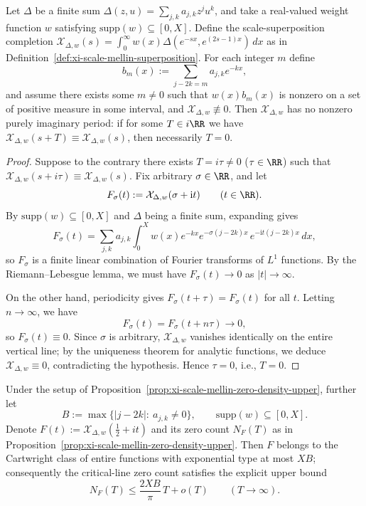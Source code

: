 \begin{proposition}\label{prop:xi-scale-mellin-no-nonzero-imag-period}
Let \(\Delta\) be a finite sum
\(
\Delta(z,u)=\sum_{j,k}a_{j,k}z^j u^k
\), and take a real-valued weight function \(w\) satisfying \(\mathrm{supp}(w)\subseteq[0,X]\).
Define the scale-superposition completion
\(
\mathcal X_{\Delta,w}(s)=\int_0^\infty w(x)\Delta(e^{-sx},e^{(2s-1)x})\,dx
\)
as in Definition~\ref{def:xi-scale-mellin-superposition}.
For each integer \(m\) define
\[
b_m(x):=\sum_{j-2k=m}a_{j,k}e^{-kx},
\]
and assume there exists some \(m\neq 0\) such that \(w(x)b_m(x)\) is nonzero on a set of positive measure in some interval, and \(\mathcal X_{\Delta,w}\not\equiv 0\).
Then \(\mathcal X_{\Delta,w}\) has no nonzero purely imaginary period: if for some \(T\in i\RR\) we have
\(
\mathcal X_{\Delta,w}(s+T)\equiv \mathcal X_{\Delta,w}(s)
\), then necessarily \(T=0\).
\end{proposition}

\begin{proof}
Suppose to the contrary there exists \(T=i\tau\neq 0\) (\(\tau\in\RR\)) such that \(\mathcal X_{\Delta,w}(s+i\tau)\equiv \mathcal X_{\Delta,w}(s)\).
Fix arbitrary \(\sigma\in\RR\), and let
\[
F_\sigma(t):=\mathcal X_{\Delta,w}(\sigma+\mathrm{i}t)\qquad(t\in\RR).
\]
By \(\mathrm{supp}(w)\subseteq[0,X]\) and \(\Delta\) being a finite sum, expanding gives
\[
F_\sigma(t)
=\sum_{j,k}a_{j,k}\int_0^X w(x)e^{-kx}e^{-\sigma(j-2k)x}\,e^{-\mathrm{i}t(j-2k)x}\,dx,
\]
so \(F_\sigma\) is a finite linear combination of Fourier transforms of \(L^1\) functions.
By the Riemann--Lebesgue lemma, we must have \(F_\sigma(t)\to 0\) as \(|t|\to\infty\).
\par
On the other hand, periodicity gives \(F_\sigma(t+\tau)=F_\sigma(t)\) for all \(t\).
Letting \(n\to\infty\), we have
\[
F_\sigma(t)=F_\sigma(t+n\tau)\longrightarrow 0,
\]
so \(F_\sigma(t)\equiv 0\).
Since \(\sigma\) is arbitrary, \(\mathcal X_{\Delta,w}\) vanishes identically on the entire vertical line; by the uniqueness theorem for analytic functions, we deduce \(\mathcal X_{\Delta,w}\equiv 0\), contradicting the hypothesis.
Hence \(\tau=0\), i.e., \(T=0\).
\end{proof}

\begin{proposition}\label{prop:xi-scale-mellin-cartwright-explicit-type}
Under the setup of Proposition~\ref{prop:xi-scale-mellin-zero-density-upper}, further let
\[
B:=\max\{|j-2k|:\ a_{j,k}\neq 0\},
\qquad
\mathrm{supp}(w)\subseteq[0,X].
\]
Denote
\(
F(t):=\mathcal X_{\Delta,w}\!\left(\tfrac12+it\right)
\)
and its zero count \(N_F(T)\) as in Proposition~\ref{prop:xi-scale-mellin-zero-density-upper}.
Then \(F\) belongs to the Cartwright class of entire functions with exponential type at most \(XB\);
consequently the critical-line zero count satisfies the explicit upper bound
\[
N_F(T)\le \frac{2XB}{\pi}\,T+o(T)\qquad(T\to\infty).
\]
\end{proposition}

